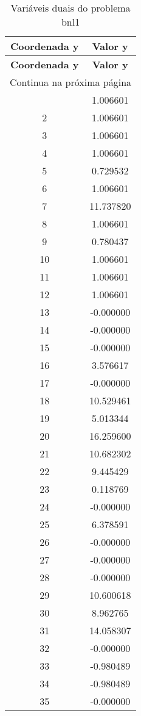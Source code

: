 \documentclass[12pt]{article}
\begin{document}
\begin{longtable}{@{}cc@{}}
\caption{Variáveis duais do problema bnl1} \\
\toprule
\textbf{Coordenada y} & \textbf{Valor y} \\
\midrule
\endfirsthead

\toprule
\textbf{Coordenada y} & \textbf{Valor y} \\
\midrule
\endhead

\midrule \multicolumn{2}{r}{{Continua na próxima página}} \\ \midrule
\endfoot

\bottomrule
\endlastfoot
1 & 1.006601 \\
2 & 1.006601 \\
3 & 1.006601 \\
4 & 1.006601 \\
5 & 0.729532 \\
6 & 1.006601 \\
7 & 11.737820 \\
8 & 1.006601 \\
9 & 0.780437 \\
10 & 1.006601 \\
11 & 1.006601 \\
12 & 1.006601 \\
13 & -0.000000 \\
14 & -0.000000 \\
15 & -0.000000 \\
16 & 3.576617 \\
17 & -0.000000 \\
18 & 10.529461 \\
19 & 5.013344 \\
20 & 16.259600 \\
21 & 10.682302 \\
22 & 9.445429 \\
23 & 0.118769 \\
24 & -0.000000 \\
25 & 6.378591 \\
26 & -0.000000 \\
27 & -0.000000 \\
28 & -0.000000 \\
29 & 10.600618 \\
30 & 8.962765 \\
31 & 14.058307 \\
32 & -0.000000 \\
33 & -0.980489 \\
34 & -0.980489 \\
35 & -0.000000 \\

\end{longtable}
\end{document}
